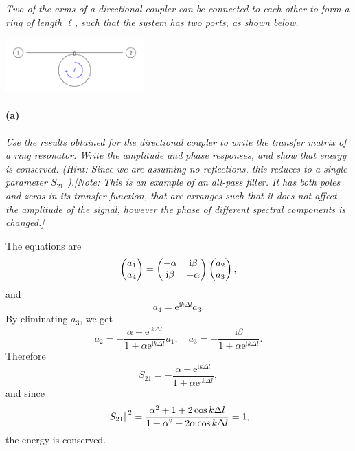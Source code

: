 \documentclass[hyperref, a4paper]{article}
\newcommand*{\ii}{\mathrm{i}}
\newcommand*{\ee}{\mathrm{e}}
\begin{document}
\subsection{}

\textit{Two of the arms of a directional coupler can be connected to each other to form a ring of length $\ell$, such that the system has two ports, as shown below.}

\begin{center}
    \includegraphics[width=0.4\textwidth]{figs/ring.PNG}
\end{center}

\paragraph*{(a)} \textit{Use the results obtained for the directional coupler to write the transfer matrix of a ring resonator. Write the amplitude and phase responses, and show that energy is conserved. (Hint: Since we are assuming no reflections, this reduces to a single parameter $S_{21}$ ).[Note: This is an example of an all-pass filter. It has both poles and zeros in its transfer function, that are arranges such that it does not affect the amplitude of the signal, however the phase of different spectral components is changed.]
} 

The equations are 
\begin{equation}
    \pmqty{a_1 \\ a_4} = \pmqty{- \alpha & \ii \beta \\ \ii \beta & - \alpha} \pmqty{a_2 \\ a_3},
\end{equation}
and 
\begin{equation}
    a_4 = \ee^{\ii k \Delta l} a_3.
\end{equation}
By eliminating $a_3$, we get 
\begin{equation}
    a_2 = - \frac{\alpha + \ee^{\ii k \Delta l}}{1 + \alpha \ee^{\ii k \Delta l}} a_1, \quad 
    a_3 = - \frac{\ii \beta}{1 + \alpha \ee^{\ii k \Delta l}}   .
\end{equation}
Therefore 
\begin{equation}
    S_{21} = - \frac{\alpha + \ee^{\ii k \Delta l}}{1 + \alpha \ee^{\ii k \Delta l}} ,
\end{equation}
and since 
\begin{equation}
    \abs*{S_{21}}^2 = \frac{\alpha^2 + 1 + 2 \cos k \Delta l}{1 + \alpha^2 + 2 \alpha \cos k \Delta l} = 1,
\end{equation}
the energy is conserved.
\end{document}
